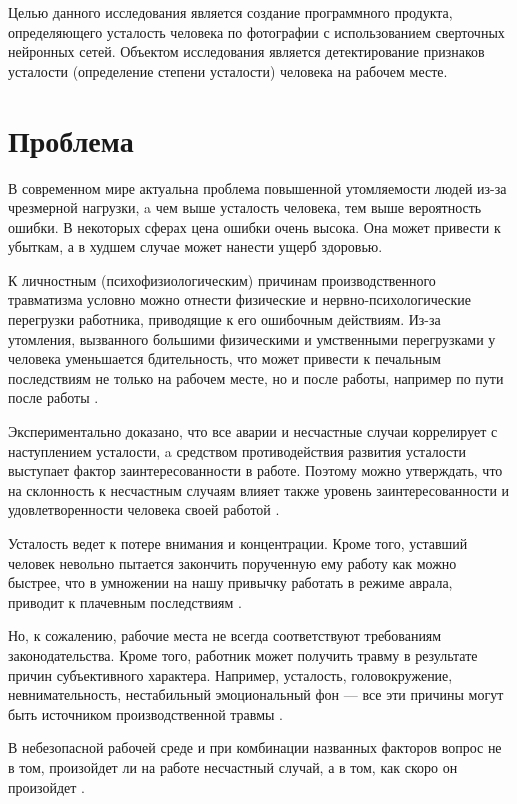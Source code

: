 \documentclass[12pt, letterpaper]{article}
\begin{document}
    Целью данного исследования является создание программного продукта, определяющего усталость человека по фотографии с использованием сверточных нейронных сетей.
    Объектом исследования является детектирование признаков усталости (определение степени усталости) человека на рабочем месте.

    \section{Проблема}\label{sec:problem}

    В современном мире актуальна проблема повышенной утомляемости людей из-за чрезмерной нагрузки,
    a чем выше усталость человека, тем выше вероятность ошибки.
    В некоторых сферах цена ошибки очень высока.
    Она может привести к убыткам, а в худшем случае может нанести ущерб здоровью.

    К личностным (психофизиологическим) причинам производственного травматизма условно можно отнести физические и нервно-психологические перегрузки работника, приводящие к его ошибочным действиям. Из-за утомления, вызванного большими физическими и умственными перегрузками у человека уменьшается бдительность, что может привести к печальным последствиям не только на рабочем месте, но и после работы, например по пути после работы \cite{noauthor__nodate-1}.

    Экспериментально доказано, что все аварии и несчастные случаи коррелирует с наступлением усталости,
    a средством противодействия развития усталости выступает фактор заинтересованности в работе.
    Поэтому можно утверждать, что на склонность к несчастным случаям влияет также уровень заинтересованности и удовлетворенности человека своей работой \cite{noauthor__nodate-2}.

    Усталость ведет к потере внимания и концентрации.
    Кроме того, уставший человек невольно пытается закончить порученную ему работу как можно быстрее, что в умножении на нашу привычку работать в режиме аврала, приводит к плачевным последствиям \cite{noauthor__nodate-4}.

    Но, к сожалению, рабочие места не всегда соответствуют требованиям законодательства.
    Кроме того, работник может получить травму в результате причин субъективного характера.
    Например, усталость, головокружение, невнимательность, нестабильный эмоциональный фон — все эти причины могут быть источником производственной травмы \cite{noauthor__nodate-3}.

    В небезопасной рабочей среде и при комбинации названных факторов вопрос не в том, произойдет ли на работе несчастный случай, а в том, как скоро он произойдет \cite{evijafeierabende__2017}.
\end{document}
